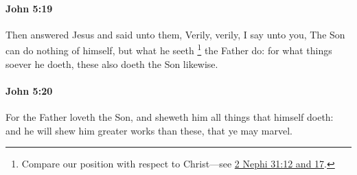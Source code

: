 		\paragraph{John 5:19} %
			\label{JOHN-5-19}

			Then answered Jesus and said unto them, Verily, verily, I say unto you, The Son can do nothing of himself, but what he seeth%
				\footnote{%
					Compare our position with respect to Christ---see \hyperref[2NEPHI-31-12]{2 Nephi 31:12 and 17}.
					}
			the Father do: for what things soever he doeth, these also doeth the Son likewise.

			\begin{framed}
			\scriptsize
				\begin{compactdesc}
					\item[SBLG] 
				\end{compactdesc}
			\end{framed}

		\paragraph{John 5:20} %
			\label{JOHN-5-20}

			For the Father loveth the Son, and sheweth him all things that himself doeth: and he will shew him greater works than these, that ye may marvel.

